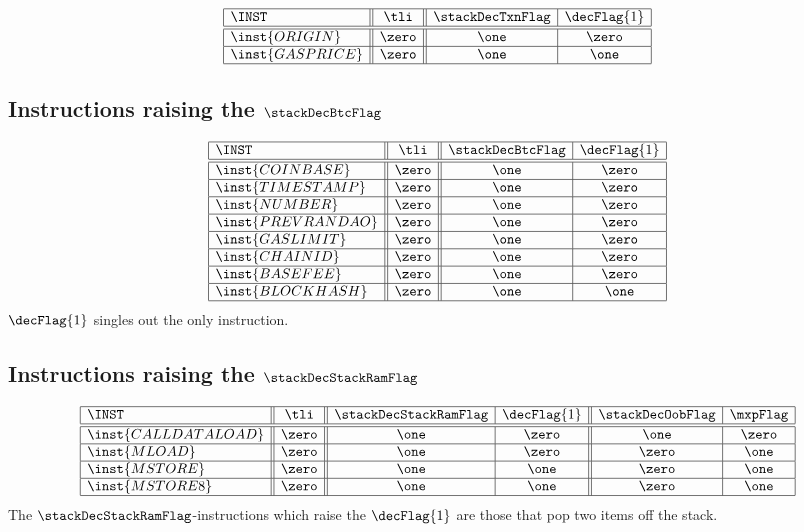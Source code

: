 \[
\begin{array}{|l||c||c|c|}
	\hline
	\INST			& \tli	& \stackDecTxnFlag	& \decFlag{1}	\\ \hline\hline
	\inst{ORIGIN}	& \zero	& \one			& \zero			\\ \hline
	\inst{GASPRICE}	& \zero	& \one			& \one			\\ \hline
\end{array}
\]

\subsection{Instructions raising the $\stackDecBtcFlag$}
\label{hub: instruction handling: Btc}

\[
\begin{array}{|l||c||c|c|}
	\hline
	\INST				& \tli	& \stackDecBtcFlag	& \decFlag{1}	\\ \hline\hline
	\inst{COINBASE}		& \zero & \one			& \zero			\\ \hline
	\inst{TIMESTAMP}	& \zero & \one			& \zero			\\ \hline
	\inst{NUMBER}		& \zero & \one			& \zero			\\ \hline
	\inst{PREVRANDAO}	& \zero & \one			& \zero			\\ \hline
	\inst{GASLIMIT}		& \zero & \one			& \zero			\\ \hline
	\inst{CHAINID}		& \zero & \one			& \zero			\\ \hline
	\inst{BASEFEE}		& \zero & \one			& \zero			\\ \hline
	\inst{BLOCKHASH}	& \zero & \one			& \one			\\ \hline
\end{array}
\]
\saNote{} $\decFlag{1}$ singles out the only \oneOneSP{} instruction.

\subsection{Instructions raising the $\stackDecStackRamFlag$}
\label{hub: instruction handling: StackRam}

\[
\begin{array}{|l||c||c|c||c|c|}
	\hline
	\INST				& \tli	& \stackDecStackRamFlag	& \decFlag{1}	& \stackDecOobFlag	& \mxpFlag	\\ \hline\hline
	\inst{CALLDATALOAD} & \zero	& \one				& \zero			& \one			& \zero		\\ \hline
	\inst{MLOAD} 		& \zero	& \one				& \zero			& \zero			& \one		\\ \hline
	\inst{MSTORE} 		& \zero	& \one				& \one			& \zero			& \one		\\ \hline
	\inst{MSTORE8} 		& \zero	& \one				& \one			& \zero			& \one		\\ \hline
\end{array}
\]
\saNote{} The $\stackDecStackRamFlag$-instructions which raise the $\decFlag{1}$ are those that pop two items off the stack.

